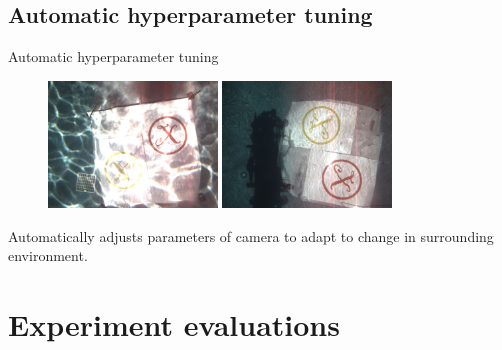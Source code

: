 \documentclass{beamer}
\begin{document}
\subsection{Automatic hyperparameter tuning}
\begin{frame}{Automatic hyperparameter tuning}
    \begin{figure}[ht]
        \centering
        \includegraphics[width=0.4\textwidth]{figs/sundale_table_flicker.png}\hspace{5em}
        \includegraphics[width=0.4\textwidth]{figs/sundale_table_shadow.png}
    \end{figure}   
    Automatically adjusts parameters of camera to adapt to change in surrounding environment.
\end{frame}


\section{Experiment evaluations}
\end{document}
